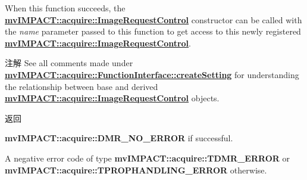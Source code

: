 When this function succeeds, the {\bfseries \hyperlink{classmv_i_m_p_a_c_t_1_1acquire_1_1_image_request_control}{mv\+I\+M\+P\+A\+C\+T\+::acquire\+::\+Image\+Request\+Control}} constructor can be called with the {\itshape name} parameter passed to this function to get access to this newly registered {\bfseries \hyperlink{classmv_i_m_p_a_c_t_1_1acquire_1_1_image_request_control}{mv\+I\+M\+P\+A\+C\+T\+::acquire\+::\+Image\+Request\+Control}}.

\begin{DoxyNote}{注解}
See all comments made under {\bfseries \hyperlink{classmv_i_m_p_a_c_t_1_1acquire_1_1_function_interface_a17e85331ed0965a52cff8b62279ef40c}{mv\+I\+M\+P\+A\+C\+T\+::acquire\+::\+Function\+Interface\+::create\+Setting}} for understanding the relationship between base and derived {\bfseries \hyperlink{classmv_i_m_p_a_c_t_1_1acquire_1_1_image_request_control}{mv\+I\+M\+P\+A\+C\+T\+::acquire\+::\+Image\+Request\+Control}} objects. 
\end{DoxyNote}
\begin{DoxyReturn}{返回}

\begin{DoxyItemize}
\item {\bfseries mv\+I\+M\+P\+A\+C\+T\+::acquire\+::\+D\+M\+R\+\_\+\+N\+O\+\_\+\+E\+R\+R\+O\+R} if successful.
\item A negative error code of type {\bfseries mv\+I\+M\+P\+A\+C\+T\+::acquire\+::\+T\+D\+M\+R\+\_\+\+E\+R\+R\+O\+R} or {\bfseries mv\+I\+M\+P\+A\+C\+T\+::acquire\+::\+T\+P\+R\+O\+P\+H\+A\+N\+D\+L\+I\+N\+G\+\_\+\+E\+R\+R\+O\+R} otherwise. 
\end{DoxyItemize}
\end{DoxyReturn}

